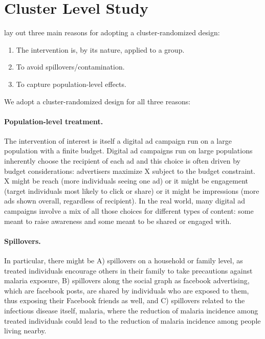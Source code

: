 \documentclass[a4paper,12pt]{article}
\begin{document}


\section{Cluster Level Study}

\cite{Hayes2017} lay out three main reasons for adopting a cluster-randomized design:

\begin{enumerate}
\item The intervention is, by its nature, applied to a group.
\item To avoid spillovers/contamination.
\item To capture population-level effects.
\end{enumerate}

\noindent We adopt a cluster-randomized design for all three reasons:

\paragraph{Population-level treatment.} The intervention of interest is itself a digital ad campaign run on a large population with a finite budget. Digital ad campaigns run on large populations inherently choose the recipient of each ad and this choice is often driven by budget considerations: advertisers maximize X subject to the budget constraint. X might be reach (more individuals seeing one ad) or it might be engagement (target individuals most likely to click or share) or it might be impressions (more ads shown overall, regardless of recipient). In the real world, many digital ad campaigns involve a mix of all those choices for different types of content: some meant to raise awareness and some meant to be shared or engaged with.


\paragraph{Spillovers.} In particular, there might be A) spillovers on a household or family level, as treated individuals encourage others in their family to take precautions against malaria exposure, B) spillovers along the social graph as facebook advertising, which are facebook posts, are shared by individuals who are exposed to them, thus exposing their Facebook friends as well, and C) spillovers related to the infectious disease itself, malaria, where the reduction of malaria incidence among treated individuals could lead to the reduction of malaria incidence among people living nearby.
\end{document}
